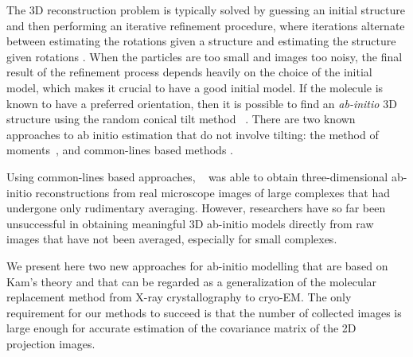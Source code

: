 The 3D reconstruction problem is typically solved by guessing an initial structure and then performing an iterative refinement procedure, where iterations alternate between estimating the rotations given a structure and estimating the structure given rotations \cite{Frank1, vanHeel1990a, gridding}. When the particles
are too small and images too noisy, the final result of the refinement process
depends heavily on the choice of the initial model, which makes
it crucial to have a good initial model. If the molecule is known to have a
preferred orientation, then it is possible to
find an \textit{ab-initio} 3D structure using the random conical tilt
method ~\cite{Radermacher, Radermacher2}. There are two known approaches to ab initio estimation that do not involve tilting: the
method of moments~\cite{Goncharov1988,Salzman1990}, and common-lines based methods \cite{Goncharov1986,vanHeel1987,Singer2011}. 

Using common-lines based approaches, ~\cite{zhao} was able to obtain three-dimensional
ab-initio reconstructions from real microscope
images of large complexes that had undergone only rudimentary averaging.
However, 
researchers have so far been
unsuccessful in obtaining meaningful 3D ab-initio models directly from raw
images that have not been averaged, especially for small complexes.

We present here two new approaches for ab-initio modelling that are based on Kam's theory \cite{kam1980} and that can be regarded
as a generalization of the molecular
replacement method from X-ray crystallography to cryo-EM. The only requirement
for our methods to
succeed is that the number of collected images is large enough for accurate estimation of the covariance matrix of the 2D projection images.

